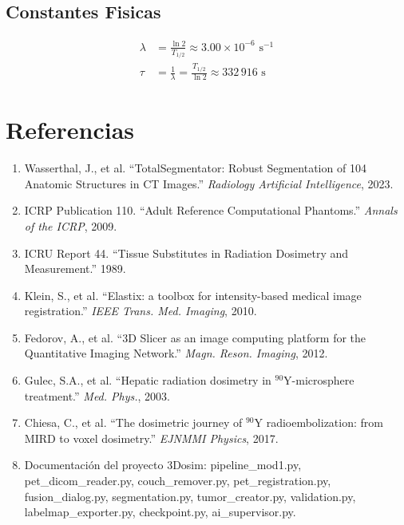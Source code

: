 \documentclass[12pt,a4paper]{article}
\begin{document}
\subsection{Constantes Fisicas}

\begin{align}
    \lambda &= \frac{\ln 2}{T_{1/2}} \approx 3.00 \times 10^{-6} \text{ s}^{-1} \\
    \tau &= \frac{1}{\lambda} = \frac{T_{1/2}}{\ln 2} \approx 332\,916 \text{ s}
\end{align}

\newpage

\section{Referencias}

\begin{enumerate}
    \item Wasserthal, J., et al. ``TotalSegmentator: Robust Segmentation
          of 104 Anatomic Structures in CT Images.'' \textit{Radiology
          Artificial Intelligence}, 2023.
    \item ICRP Publication 110. ``Adult Reference Computational
          Phantoms.'' \textit{Annals of the ICRP}, 2009.
    \item ICRU Report 44. ``Tissue Substitutes in Radiation Dosimetry
          and Measurement.'' 1989.
    \item Klein, S., et al. ``Elastix: a toolbox for intensity-based
          medical image registration.'' \textit{IEEE Trans. Med.
          Imaging}, 2010.
    \item Fedorov, A., et al. ``3D Slicer as an image computing
          platform for the Quantitative Imaging Network.''
          \textit{Magn. Reson. Imaging}, 2012.
    \item Gulec, S.A., et al. ``Hepatic radiation dosimetry in
          $^{90}$Y-microsphere treatment.'' \textit{Med. Phys.}, 2003.
    \item Chiesa, C., et al. ``The dosimetric journey of $^{90}$Y
          radioembolization: from MIRD to voxel dosimetry.''
          \textit{EJNMMI Physics}, 2017.
    \item Documentación del proyecto 3Dosim: pipeline\_mod1.py,
          pet\_dicom\_reader.py, couch\_remover.py,
          pet\_registration.py, fusion\_dialog.py, segmentation.py,
          tumor\_creator.py, validation.py, labelmap\_exporter.py,
          checkpoint.py, ai\_supervisor.py.
\end{enumerate}
\end{document}
